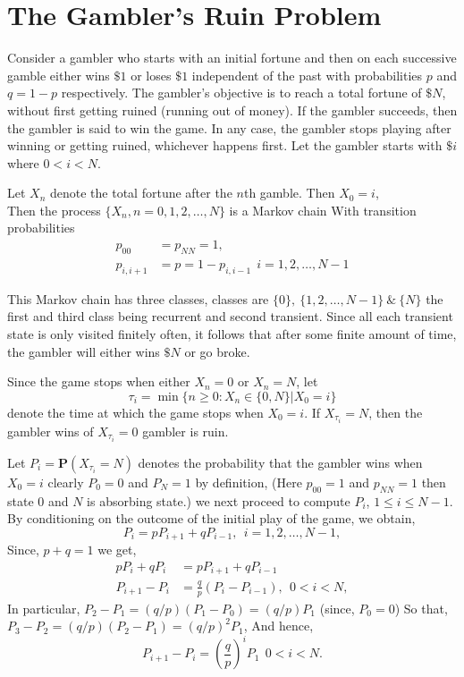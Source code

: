 \section{The Gambler's Ruin Problem}
Consider a gambler who starts with an initial fortune and then on each successive gamble
either wins $\$1$ or loses $\$1$ independent of the past with probabilities $p$ and $q = 1-p$ respectively.
The gambler's objective is to reach a total fortune of $\$N$, without first getting ruined (running out of money). If the gambler succeeds,
then the gambler is said to win the game. In any case, the gambler stops playing after winning
or getting ruined, whichever happens first. Let the gambler starts with $\$i$ where $0 < i < N$.

Let $X_{n}$ denote the total fortune after the $n$th gamble. Then $X_{0}=i$, \\
Then the process $ \{X_{n},n=0,1,2,\ldots,N\} $ is a Markov chain With 
transition probabilities
\begin{align*}
    p_{00} &= p_{N N} = 1,\\ 
    p_{i,i+1} &= p = 1-p_{i,i-1} \ \ i=1,2,\ldots,N-1
\end{align*}

This Markov chain has three classes, classes are $ \{0\},\ \{1,2,\ldots,N-1\}\ \&\ \{N\} $ the first and third class being recurrent and 
second transient. Since all each transient state is only visited finitely often, it follows that after some finite amount of time, the gambler
will either wins $ \$N $ or go broke.

Since the game stops when either $X_{n} = 0$ or $X_{n} = N$, let
\[
    \tau_{i} = \min{\{n\ge 0: X_{n}\in\{0,N\}|X_{0}=i\}} 
\]
denote the time at which the game stops when $ X_{0} = i $. If $ X_{\tau_{i}} = N $, then the gambler wins of $ X_{\tau_{i}} = 0 $ gambler is ruin.

Let $ P_{i} = \mathbf{P}(X_{\tau_{i}} = N) $ denotes the probability that the gambler wins when $ X_{0} = i $ clearly $ P_{0} = 0 $ and $ P_{N} = 1 $ 
by definition, (Here $ p_{00}=1  $ and $ p_{N N}=1 $ then state 0 and $ N $ is absorbing state.) 
we next proceed to compute $P_i$, $1 \le  i \le  N - 1$. By conditioning on the outcome of the initial play of the game, we obtain,
\[
    P_{i} = pP_{i+1} + qP_{i-1}, \ \ i=1,2,\ldots,N-1,
\]
Since, $ p + q = 1 $ we get, 
\begin{align*}
    pP_{i} + qP_{i} &= pP_{i+1} + qP_{i-1}\\ 
    P_{i+1} - P_{i} &= \frac{q}{p}(P_{i}-P_{i-1}), \ \ 0<i<N,
\end{align*}
In particular, $ P_{2}-P_{1}=(q/p)(P_{1}-P_{0})=(q/p)P_{1} $ (since, $ P_{0} = 0 $) So that,\\ 
$ P_{3}-P_{2}=(q/p)(P_{2}-P_{1}) = (q/p)^{2}P_{1}$, And hence,
\begin{equation*}
    P_{i+1} -P_{i} = \left( \frac{q}{p} \right)^{i}P_{1}\ \  0<i<N.
\end{equation*}

